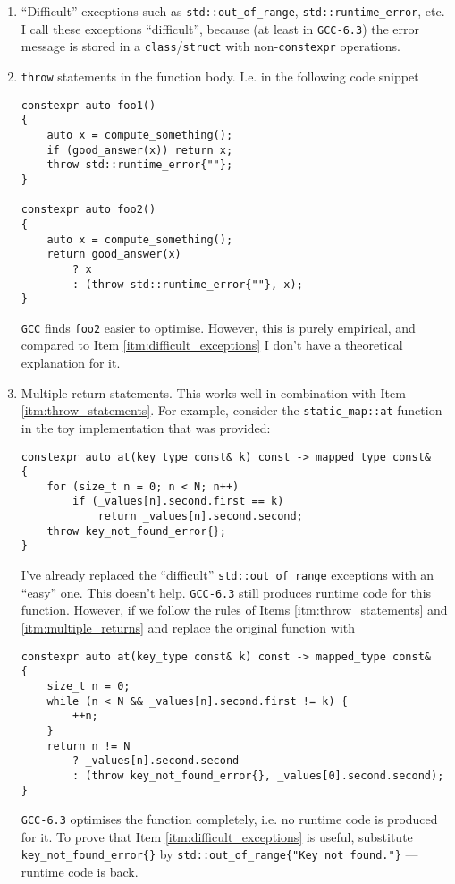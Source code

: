 \documentclass[a4paper,12pt]{article}
\begin{document}
    \begin{enumerate}
    \item \label{itm:difficult_exceptions} ``Difficult'' exceptions such as \texttt{std::out\_of\_range}, \texttt{std::runtime\_error}, etc. I call these exceptions ``difficult'', because (at least in \texttt{GCC-6.3}) the error message is stored in a \texttt{class}/\texttt{struct} with non-\texttt{constexpr} operations.
    \item \label{itm:throw_statements} \texttt{throw} statements in the function body. I.e. in the following code snippet
        \begin{spacing}{0.8}
\begin{lstlisting}
constexpr auto foo1()
{
    auto x = compute_something();
    if (good_answer(x)) return x;
    throw std::runtime_error{""};
}

constexpr auto foo2()
{
    auto x = compute_something();
    return good_answer(x)
        ? x
        : (throw std::runtime_error{""}, x);
}
\end{lstlisting}
        \end{spacing}
        \texttt{GCC} finds \texttt{foo2} easier to optimise. However, this is purely empirical, and compared to Item \ref{itm:difficult_exceptions} I don't have a theoretical explanation for it.

    \item \label{itm:multiple_returns} Multiple return statements. This works well in combination with Item \ref{itm:throw_statements}. For example, consider the \texttt{static\_map::at} function in the toy implementation that was provided:
        \begin{spacing}{0.8}
\begin{lstlisting}
constexpr auto at(key_type const& k) const -> mapped_type const&
{
    for (size_t n = 0; n < N; n++)
        if (_values[n].second.first == k)
            return _values[n].second.second;
    throw key_not_found_error{};
}
\end{lstlisting}
        \end{spacing}
        I've already replaced the ``difficult'' \texttt{std::out\_of\_range} exceptions with an ``easy'' one. This doesn't help. \texttt{GCC-6.3} still produces runtime code for this function. However, if we follow the rules of Items \ref{itm:throw_statements} and \ref{itm:multiple_returns} and replace the original function with
        \begin{spacing}{0.8}
\begin{lstlisting}
constexpr auto at(key_type const& k) const -> mapped_type const&
{
    size_t n = 0;
    while (n < N && _values[n].second.first != k) {
        ++n;
    }
    return n != N
        ? _values[n].second.second
        : (throw key_not_found_error{}, _values[0].second.second);
}
\end{lstlisting}
        \end{spacing}
        \texttt{GCC-6.3} optimises the function completely, i.e. no runtime code is produced for it. To prove that Item \ref{itm:difficult_exceptions} is useful, substitute \texttt{key\_not\_found\_error\{\}} by \texttt{std::out\_of\_range\{"Key not found."\}} --- runtime code is back.
    \end{enumerate}
    
\end{document}
